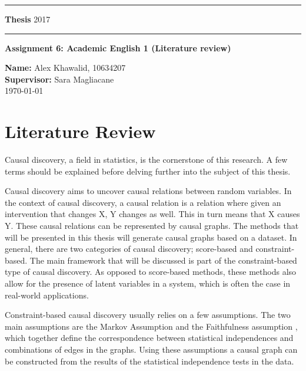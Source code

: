 \documentclass[11pt]{article}
\newcommand{\Sara}[1]{{\color{blue} Sara: #1}}
\begin{document}
\rule{\textwidth}{1pt}

\textbf{Thesis} \hfill 2017
\rule{\textwidth}{1pt}
\vspace*{20pt}


\textbf{Assignment 6:  Academic English 1 (Literature review)}

\textbf{Name:} Alex Khawalid, 10634207\\
\textbf{Supervisor:} Sara Magliacane\\
\today	
\section{Literature Review}


Causal discovery, a field in statistics, is the cornerstone of this research. A few terms should be explained before delving further into the subject of this thesis.

Causal discovery aims to uncover causal relations between random variables. In the context of causal discovery, a causal relation is a relation where given an intervention that changes X, Y changes as well. This in turn means that X causes Y.
These causal relations can be represented by causal graphs. The methods that will be presented in this thesis will generate causal graphs based on a dataset.
In general, there are two categories of causal discovery; score-based and constraint-based. The main framework that will be discussed is part of the constraint-based type of causal discovery. As opposed to score-based methods, these methods also allow for the presence of latent variables in a system, which is often the case in real-world applications.

Constraint-based causal discovery usually relies on a few assumptions. The two main assumptions are the Markov Assumption and the Faithfulness assumption \cite{fci,jci}, which together define the correspondence between statistical independences and combinations of edges in the graphs. Using these assumptions a causal graph can be constructed from the results of the statistical independence tests in the data.
\end{document}
